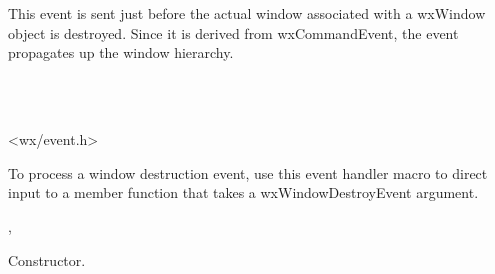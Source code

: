 \section{}\label{wxwindowdestroyevent}

This event is sent just before the actual window associated with a wxWindow object
is destroyed. Since it is derived from wxCommandEvent, the event propagates up
the window hierarchy.


\\
\\


<wx/event.h>


To process a window destruction event, use this event handler macro to direct input to a member
function that takes a wxWindowDestroyEvent argument.

\twocolwidtha{7cm}
\begin{twocollist}\itemsep=0pt
\end{twocollist}%


,\rtfsp
{}


\label{wxwindowdestroyeventctor}


Constructor.

